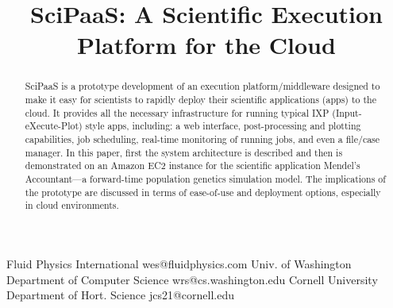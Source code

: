 \documentclass[10pt,reprint]{socc14}
\begin{document}
\setlength{\pdfpageheight}{\paperheight}
\setlength{\pdfpagewidth}{\paperwidth}






\title{SciPaaS: A Scientific Execution Platform for the Cloud}

           {Fluid Physics International}
           {wes@fluidphysics.com}
           {Univ. of Washington}
           {Department of Computer Science}
           {wrs@cs.washington.edu}
           {Cornell University}
           {Department of Hort. Science}
           {jcs21@cornell.edu}

\maketitle

\begin{abstract}
SciPaaS is a prototype development of an execution platform/middleware designed to make it easy for scientists to rapidly deploy their scientific applications (apps) to the cloud.  It provides all the necessary infrastructure for running typical IXP (Input-eXecute-Plot) style apps, including: a web interface, post-processing and plotting capabilities, job scheduling, real-time monitoring of running jobs, and even a file/case manager.   In this paper, first the system architecture is described and then is demonstrated on an Amazon EC2 instance for the scientific application Mendel’s Accountant—a forward-time population genetics simulation model.  The implications of the prototype are discussed in terms of ease-of-use and deployment options, especially in cloud environments.
\end{abstract}
\end{document}
